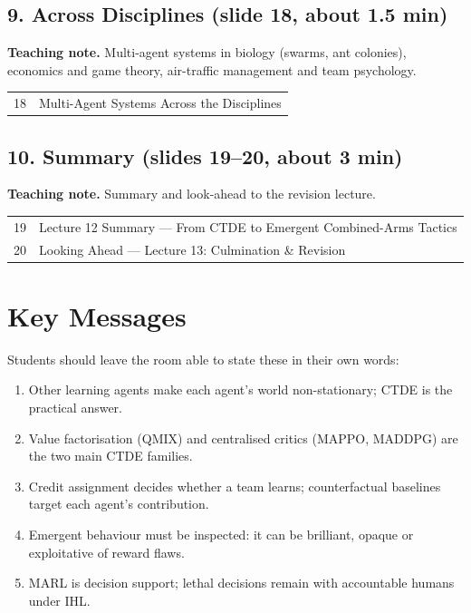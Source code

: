 \documentclass[11pt]{article}
\begin{document}
\subsection{9. Across Disciplines \normalfont\small\color{GreyN}(slide 18, about 1.5 min)}

\textbf{Teaching note.} Multi-agent systems in biology (swarms, ant colonies), economics and game theory, air-traffic management and team psychology.

\begin{center}\small\renewcommand{\arraystretch}{1.1}\begin{tabularx}{\textwidth}{@{}r X@{}}18 & Multi-Agent Systems Across the Disciplines\\\end{tabularx}\end{center}

\subsection{10. Summary \normalfont\small\color{GreyN}(slides 19--20, about 3 min)}

\textbf{Teaching note.} Summary and look-ahead to the revision lecture.

\begin{center}\small\renewcommand{\arraystretch}{1.1}\begin{tabularx}{\textwidth}{@{}r X@{}}19 & Lecture 12 Summary --- From CTDE to Emergent Combined-Arms Tactics\\
20 & Looking Ahead --- Lecture 13: Culmination \& Revision\\\end{tabularx}\end{center}

\section{Key Messages}Students should leave the room able to state these in their own words:\begin{keypoint}\begin{enumerate}\item Other learning agents make each agent's world non-stationary; CTDE is the practical answer.\item Value factorisation (QMIX) and centralised critics (MAPPO, MADDPG) are the two main CTDE families.\item Credit assignment decides whether a team learns; counterfactual baselines target each agent's contribution.\item Emergent behaviour must be inspected: it can be brilliant, opaque or exploitative of reward flaws.\item MARL is decision support; lethal decisions remain with accountable humans under IHL.\end{enumerate}\end{keypoint}
\end{document}
